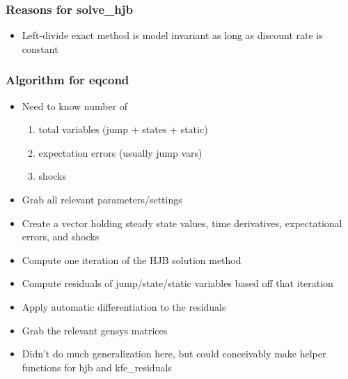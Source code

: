 \documentclass{beamer}
\begin{document}
\begin{frame}
  \frametitle{Reasons for solve\_hjb}
  \begin{itemize}
  \item Left-divide exact method is model invariant as long as discount rate is constant
  \end{itemize}
\end{frame}
\begin{frame}
\frametitle{Algorithm for eqcond}
\begin{itemize}
\item Need to know number of
  \begin{enumerate}
  \item total variables (jump + states + static)
  \item expectation errors (usually jump vars)
  \item shocks
  \end{enumerate}
\item Grab all relevant parameters/settings
\item Create a vector holding steady state values, time derivatives, expectational errors, and shocks
\item Compute one iteration of the HJB solution method
\item Compute residuals of jump/state/static variables based off that iteration
\item Apply automatic differentiation to the residuals
\item Grab the relevant gensys matrices
\item Didn't do much generalization here, but could conceivably make helper functions for hjb and kfe\_residuals
\end{itemize}
\end{frame}
\end{document}
